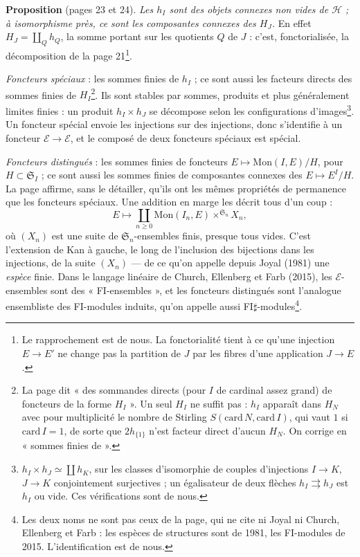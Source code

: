 \documentclass[11pt,a4paper]{article}
\begin{document}
\textbf{Proposition} (pages 23 et 24). \emph{Les $h_I$ sont des objets
connexes non vides de $\mathcal{H}$ ; à isomorphisme près, ce sont les
composantes connexes des $H_J$.} En effet $H_J = \coprod_Q h_Q$, la somme
portant sur les quotients $Q$ de $J$ : c'est, fonctorialisée, la
décomposition de la page 21\footnote{Le rapprochement est de nous. La
fonctorialité tient à ce qu'une injection $E \to E'$ ne change pas la
partition de $J$ par les fibres d'une application $J \to E$.}.

\emph{Foncteurs spéciaux} : les sommes finies de $h_I$ ; ce sont aussi les
facteurs directs des sommes finies de $H_I$\footnote{La page dit « des
sommandes directs (pour $I$ de cardinal assez grand) de foncteurs de la forme
$H_I$ ». Un seul $H_I$ ne suffit pas : $h_{I}$ apparaît dans $H_N$ avec pour
multiplicité le nombre de Stirling $S(\mathrm{card}\,N, \mathrm{card}\,I)$,
qui vaut $1$ si $\mathrm{card}\,I = 1$, de sorte que $2h_{\{1\}}$ n'est
facteur direct d'aucun $H_N$. On corrige en « sommes finies de ».}. Ils
sont stables par sommes, produits et plus généralement limites finies : un
produit $h_I \times h_J$ se décompose selon les configurations
d'images\footnote{$h_I \times h_J \simeq \coprod h_K$, sur les classes
d'isomorphie de couples d'injections $I \to K$, $J \to K$ conjointement
surjectives ; un égalisateur de deux flèches $h_I \rightrightarrows h_J$ est
$h_I$ ou vide. Ces vérifications sont de nous.}. Un foncteur spécial envoie
les injections sur des injections, donc s'identifie à un foncteur
$\mathcal{E} \to \mathcal{E}$, et le composé de deux foncteurs spéciaux est
spécial.

\emph{Foncteurs distingués} : les sommes finies de foncteurs
$E \mapsto \mathrm{Mon}(I, E)/H$, pour $H \subset \mathfrak{S}_I$ ; ce sont
aussi les sommes finies de composantes connexes des
$E \mapsto E^{I}/H$. La page affirme, sans le détailler, qu'ils ont les mêmes
propriétés de permanence que les foncteurs spéciaux. Une addition en marge
les décrit tous d'un coup :
\[
E \longmapsto \coprod_{n \geqslant 0} \mathrm{Mon}(I_n, E)
\times^{\mathfrak{S}_n} X_n,
\]
où $(X_n)$ est une suite de $\mathfrak{S}_n$-ensembles finis, presque tous
vides. C'est l'extension de Kan à gauche, le long de l'inclusion des
bijections dans les injections, de la suite $(X_n)$ — de ce qu'on appelle
depuis Joyal (1981) une \emph{espèce} finie. Dans le langage linéaire de
Church, Ellenberg et Farb (2015), les $\mathcal{E}$-ensembles sont des
« FI-ensembles », et les foncteurs distingués sont l'analogue ensembliste
des FI-modules induits, qu'on appelle aussi FI$\sharp$-modules\footnote{Les
deux noms ne sont pas ceux de la page, qui ne cite ni Joyal ni Church,
Ellenberg et Farb : les espèces de structures sont de 1981, les FI-modules
de 2015. L'identification est de nous.}.
\end{document}
